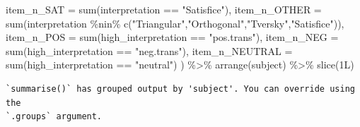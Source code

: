 \documentclass[
  letterpaper,
  DIV=11,
  numbers=noendperiod]{scrreprt}
\newenvironment{Shaded}{\begin{snugshade}}{\end{snugshade}}
\newcommand{\AttributeTok}[1]{\textcolor[rgb]{0.40,0.45,0.13}{#1}}
\newcommand{\FunctionTok}[1]{\textcolor[rgb]{0.28,0.35,0.67}{#1}}
\newcommand{\NormalTok}[1]{\textcolor[rgb]{0.00,0.23,0.31}{#1}}
\newcommand{\SpecialCharTok}[1]{\textcolor[rgb]{0.37,0.37,0.37}{#1}}
\newcommand{\StringTok}[1]{\textcolor[rgb]{0.13,0.47,0.30}{#1}}
\begin{document}
\begin{Shaded}
\begin{Highlighting}[]
  \AttributeTok{item\_n\_SAT =} \FunctionTok{sum}\NormalTok{(interpretation }\SpecialCharTok{==} \StringTok{"Satisfice"}\NormalTok{),}
  \AttributeTok{item\_n\_OTHER =} \FunctionTok{sum}\NormalTok{(interpretation }\SpecialCharTok{\%nin\%} \FunctionTok{c}\NormalTok{(}\StringTok{"Triangular"}\NormalTok{,}\StringTok{"Orthogonal"}\NormalTok{,}\StringTok{"Tversky"}\NormalTok{,}\StringTok{"Satisfice"}\NormalTok{)),}
  \AttributeTok{item\_n\_POS =} \FunctionTok{sum}\NormalTok{(high\_interpretation }\SpecialCharTok{==} \StringTok{"pos.trans"}\NormalTok{),}
  \AttributeTok{item\_n\_NEG =} \FunctionTok{sum}\NormalTok{(high\_interpretation }\SpecialCharTok{==} \StringTok{"neg.trans"}\NormalTok{),}
  \AttributeTok{item\_n\_NEUTRAL =} \FunctionTok{sum}\NormalTok{(high\_interpretation }\SpecialCharTok{==} \StringTok{"neutral"}\NormalTok{)}
\NormalTok{) }\SpecialCharTok{\%\textgreater{}\%} \FunctionTok{arrange}\NormalTok{(subject) }\SpecialCharTok{\%\textgreater{}\%} \FunctionTok{slice}\NormalTok{(1L)}
\end{Highlighting}
\end{Shaded}

\begin{verbatim}
`summarise()` has grouped output by 'subject'. You can override using the
`.groups` argument.
\end{verbatim}
\end{document}
